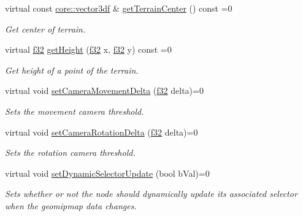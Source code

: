 \begin{DoxyCompactItemize}
\mbox{\label{classirr_1_1scene_1_1ITerrainSceneNode_a804241f60c853e74fcb8687cd887f1b7}} 
virtual const \hyperlink{namespaceirr_1_1core_ae6e2b2a6c552833ebbd5b7463d03586b}{core\+::vector3df} \& \hyperlink{classirr_1_1scene_1_1ITerrainSceneNode_a804241f60c853e74fcb8687cd887f1b7}{get\+Terrain\+Center} () const =0
\begin{DoxyCompactList}\small\item\em Get center of terrain. \end{DoxyCompactList}\item 
\mbox{\label{classirr_1_1scene_1_1ITerrainSceneNode_a9289839822ea77496af62f311f01c8bb}} 
virtual \hyperlink{namespaceirr_a0277be98d67dc26ff93b1a6a1d086b07}{f32} \hyperlink{classirr_1_1scene_1_1ITerrainSceneNode_a9289839822ea77496af62f311f01c8bb}{get\+Height} (\hyperlink{namespaceirr_a0277be98d67dc26ff93b1a6a1d086b07}{f32} x, \hyperlink{namespaceirr_a0277be98d67dc26ff93b1a6a1d086b07}{f32} y) const =0
\begin{DoxyCompactList}\small\item\em Get height of a point of the terrain. \end{DoxyCompactList}\item 
virtual void \hyperlink{classirr_1_1scene_1_1ITerrainSceneNode_af2c07f67c1c5319de4a796ec57950ec3}{set\+Camera\+Movement\+Delta} (\hyperlink{namespaceirr_a0277be98d67dc26ff93b1a6a1d086b07}{f32} delta)=0
\begin{DoxyCompactList}\small\item\em Sets the movement camera threshold. \end{DoxyCompactList}\item 
virtual void \hyperlink{classirr_1_1scene_1_1ITerrainSceneNode_ad11f3e54c291487c49868728a5228b5e}{set\+Camera\+Rotation\+Delta} (\hyperlink{namespaceirr_a0277be98d67dc26ff93b1a6a1d086b07}{f32} delta)=0
\begin{DoxyCompactList}\small\item\em Sets the rotation camera threshold. \end{DoxyCompactList}\item 
virtual void \hyperlink{classirr_1_1scene_1_1ITerrainSceneNode_a95cf695e54f1ef3376f7a3666c2dd834}{set\+Dynamic\+Selector\+Update} (bool b\+Val)=0
\begin{DoxyCompactList}\small\item\em Sets whether or not the node should dynamically update its associated selector when the geomipmap data changes. \end{DoxyCompactList}\item 

\end{DoxyCompactItemize}
